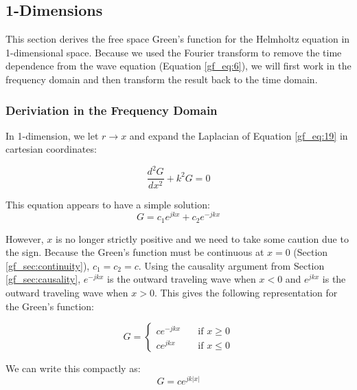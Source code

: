 \subsection{1-Dimensions}
This section derives the free space Green's function for the Helmholtz equation in 1-dimensional space. Because we used the Fourier transform to remove the time dependence from the wave equation (Equation \ref{gf_eq:6}), we will first work in the frequency domain and then transform the result back to the time domain.

\subsubsection{Deriviation in the Frequency Domain}
In 1-dimension, we let $r\rightarrow x$ and expand the Laplacian of Equation \ref{gf_eq:19} in cartesian coordinates:

\begin{equation}
\frac{d^2G}{d x^2}+k^2G = 0
\label{gf_eq:41}
\end{equation}
\renewcommand{\baselinestretch}{2} \small\normalsize

\noindent This equation appears to have a simple solution:
\begin{equation}
G=c_1e^{jkx}+c_2e^{-jkx}
\label{gf_eq:42}
\end{equation}
\renewcommand{\baselinestretch}{2} \small\normalsize

However, $x$ is no longer strictly positive and we need to take some caution due to the sign. Because the Green's function must be continuous at $x=0$ (Section \ref{gf_sec:continuity}), $c_1=c_2=c$. Using the causality argument from Section \ref{gf_sec:causality}, $e^{-jkx}$ is the outward traveling wave when $x < 0$ and $e^{jkx}$ is the outward traveling wave when $x>0$. This gives the following representation for the Green's function:

\begin{equation}
G =
  \begin{cases}
    ce^{-jkx}      & \quad \text{if } x\geq 0\\
    ce^{jkx}    & \quad \text{if } x \leq 0
  \end{cases}
\label{gf_eq:43}
\end{equation}
\renewcommand{\baselinestretch}{2} \small\normalsize

\noindent We can write this compactly as:
\begin{equation}
G=ce^{jk|x|}
\label{gf_eq:44}
\end{equation}
\renewcommand{\baselinestretch}{2} \small\normalsize

